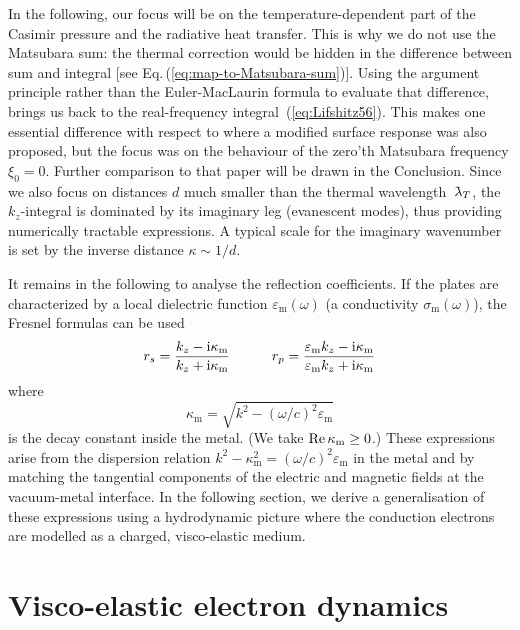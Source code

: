 \documentclass[11pt, oneside]{article}   	%
\newcommand{\lambdabar}{{\mkern+04mu\mathchar'26\mkern-09mu\lambda}}
\newcommand{\bulk}[1]{_{\mathrm{#1}}}
\begin{document}
In the following, our focus will be on the temperature-dependent part of the
Casimir pressure and the radiative heat transfer. This is why
we do not use the Matsubara sum: the thermal
correction would be hidden in the difference between sum and integral 
[see Eq.\,(\ref{eq:map-to-Matsubara-sum})]. Using the argument
principle rather than the Euler-MacLaurin formula to evaluate that difference, brings
us back to the real-frequency integral~(\ref{eq:Lifshitz56}). 
This makes one essential difference with respect to \citet{Klimchitskaya_2020b} 
where a modified surface response was also proposed, but the focus was
on the behaviour of the zero'th Matsubara frequency $\xi_0 = 0$. Further comparison
to that paper will be drawn in the Conclusion.
Since we also focus
on distances $d$ much smaller than the thermal wavelength $\lambdabar_T$, the
$k_z$-integral is dominated by its imaginary leg (evanescent modes), thus providing
numerically tractable expressions. A typical scale for the imaginary wavenumber
is set by the inverse distance $\kappa \sim 1/d$.

It remains in the following to analyse the reflection coefficients. 
If the plates are characterized by a local dielectric function $\varepsilon\bulk{m}(\omega)$ 
(a conductivity $\sigma\bulk{m}(\omega)$),
the Fresnel formulas can be used
\begin{align}
r_s &= \frac{k_z - {\rm i} \kappa\bulk{m}}{k_z + {\rm i} \kappa\bulk{m}}
\qquad
& r_p = \frac{\varepsilon\bulk{m} k_z - {\rm i} \kappa\bulk{m}}{\varepsilon\bulk{m} k_z + {\rm i} \kappa\bulk{m}} 
\label{eq:Fresnel_TE}
\end{align}
where 
\begin{equation}
\kappa\bulk{m} = \sqrt{ k^2 - (\omega/c)^2 \varepsilon\bulk{m} }
\label{eq:def-kmz}
\end{equation}
is the decay constant inside the metal.
(We take $\mathop{\rm Re} \kappa\bulk{m} \ge 0$.)
These expressions arise from the dispersion relation
$k^2 - \kappa\bulk{m}^2 = (\omega/c)^2 \varepsilon\bulk{m}$
in the metal and by matching the tangential components of the electric and magnetic
fields at the vacuum-metal interface. In the following section, we derive a 
generalisation of these expressions using a hydrodynamic picture where the conduction
electrons are modelled as a charged, visco-elastic medium.



\section{Visco-elastic electron dynamics}
\end{document}

